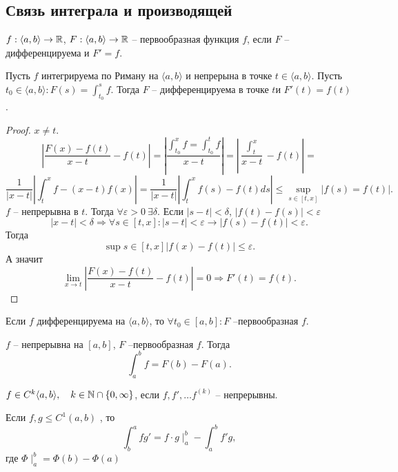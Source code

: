 \documentclass[11pt]{book}
\begin{document}
\subsection{Связь интеграла и производящей}
$ f : \langle a, b \rangle  \to  \mathbb{R}$, $ F: \langle a, b \rangle \to  \mathbb{R}$ -- первообразная функция $ f$, если $ F$ -- дифференцируема и $ F' = f$.
\begin{thm}
    Пусть $ f$ интегрируема по Риману на $ \langle a, b \rangle$ и непрерына в точке $ t \in  \langle a, b \rangle$. Пусть $ t_0 \in  \langle a, b \rangle: F(s) = \int_{t_0} ^{s} f$.
    Тогда $ F$ -- дифференцируема в точке $ t$и $ F'(t) = f(t)$.
\end{thm}
\begin{proof}
    $ x \ne t$.\[
	\left |	\frac{F(x) - f(t)}{x-t} - f(t) \right | = \left| \frac{\int_{t_0}^{x} f = \int_{t_0} ^{t} f}{x - t} \right| = \left| \frac{\int_t^{x}}{x - t} - f(t) \right|  =
    \]
    \[
	\frac{1}{|x-t|} \left| \int _t ^{ x} f - (x-t)f(x) \right|  = \frac{1}{|x-t|}\left |{\int_t ^{x} f(s) - f(t) ds } \right | \le  \sup_{s \in  [t, x] } |f(s) = f(t)|
    .\]
    $ f$ -- непрерывна в $ t$. Тогда $ \forall  \varepsilon  > 0 ~ \exists  \delta  $. Если $| s- t| < \delta$, $ |f(t) - f(s) |< \varepsilon $
    \[
	|x - t| < \delta  \Longrightarrow \forall s \in  [t, x]: |s - t| < \varepsilon  \to |f(s) - f(t) | < \varepsilon
    .\]
    Тогда \[
	\sup{s \in [t, x]} |f(x) - f(t)| \le  \varepsilon
    .\]
    А значит \[
	\lim_{x \to  t} |\frac{F(x) - f(t)}{x -t}- f(t)| = 0 \Longrightarrow F'(t) = f(t)
    .\]
\end{proof}
\begin{cor}
    Если $ f$ дифференцируема на $ \langle a, b \rangle$, то $ \forall t_0 \in  [a, b]: F $ --первообразная $ f$.
\end{cor}
\begin{cor}
    $ f$ -- непрерывна на $ [a, b]$, $ F$ --первообразная $ f$. Тогда \[
	\int_a^{b} f = F(b) - F(a)
    .\]
\end{cor}
\begin{defn}
    $ f \in  C^{k} \langle a, b \rangle, \quad k \in \mathbb{N} \cap  \{0,  \infty\}$, если $ f, f', \ldots f^{(k)} $ -- непрерывны.
\end{defn}
\begin{thm}
    Если $ f, g \le  C^{1} (a, b)$ , то
    \[
	\int _b ^{a} f g' = f \cdot g \mid _a ^{ b} - \int_a ^{ b} f' g
    ,\]
    где $ \Phi \mid _a ^{ b} = \Phi(b) - \Phi(a)$
\end{thm}
\end{document}
